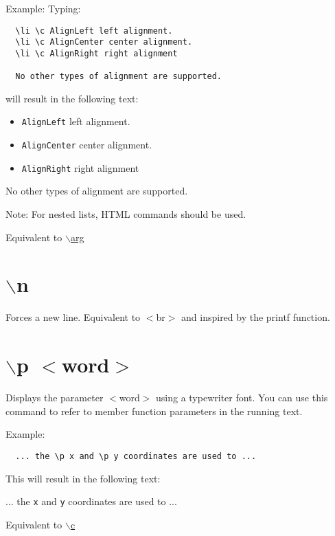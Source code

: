 \begin{Desc}
\item[Example:]Typing: 

\footnotesize\begin{verbatim}
  \li \c AlignLeft left alignment.
  \li \c AlignCenter center alignment.
  \li \c AlignRight right alignment
  
  No other types of alignment are supported.
  \end{verbatim}
\normalsize
 will result in the following text:\par
\par
 \begin{itemize}
\item {\tt AlignLeft} left alignment. \item {\tt AlignCenter} center alignment. \item {\tt AlignRight} right alignment \end{itemize}
\par
 No other types of alignment are supported.\end{Desc}
\begin{Desc}
\item[Note:]For nested lists, HTML commands should be used.\end{Desc}
Equivalent to \hyperlink{commands_cmdarg}{$\backslash$arg}



 \hypertarget{commands_cmdn}{}\section{$\backslash$n}\label{commands_cmdn}
 Forces a new line. Equivalent to $<$br$>$ and inspired by the printf function.



 \hypertarget{commands_cmdp}{}\section{$\backslash$p $<$word$>$}\label{commands_cmdp}
 Displays the parameter $<$word$>$ using a typewriter font. You can use this command to refer to member function parameters in the running text.

\begin{Desc}
\item[Example:]

\footnotesize\begin{verbatim}
  ... the \p x and \p y coordinates are used to ...
  \end{verbatim}
\normalsize
 This will result in the following text:\par
\par
 ... the {\tt x} and {\tt y} coordinates are used to ...\end{Desc}
Equivalent to \hyperlink{commands_cmdc}{$\backslash$c}



